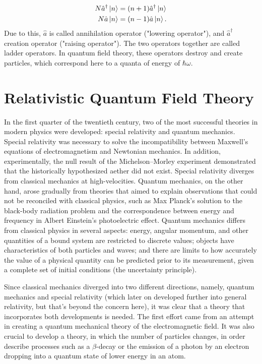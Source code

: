 \begin{equation}
\begin{split}
N\hat{a}^\dagger \ket{n} &= (n+1)\hat{a}^\dagger\ket{n} \\
N\hat{a}\ket{n} &= (n-1)\hat{a}\ket{n}.
\end{split}
\end{equation}
Due to this, $\hat{a}$ is called annihilation operator ("lowering operator"), and $\hat{a}^\dagger$ creation operator ("raising operator"). The two operators together are called ladder operators. In quantum field theory, these operators destroy and create particles, which correspond here to a quanta of energy of $\hbar\omega$.

\section{Relativistic Quantum Field Theory}
\label{sec:rqft}

In the first quarter of the twentieth century, two of the most successful theories in modern physics were developed: special relativity and quantum mechanics. Special relativity was necessary to solve the incompatibility between Maxwell's equations of electromagnetism and Newtonian mechanics. In addition, experimentally, the null result of the Michelson–Morley experiment demonstrated that the historically hypothesized aether did not exist. Special relativity diverges from classical mechanics at high-velocities. Quantum mechanics, on the other hand, arose gradually from theories that aimed to explain observations that could not be reconciled with classical physics, such as Max Planck's solution to the black-body radiation problem and the correspondence between energy and frequency in Albert Einstein's photoelectric effect. Quantum mechanics differs from classical physics in several aspects: energy, angular momentum, and other quantities of a bound system are restricted to discrete values; objects have characteristics of both particles and waves; and there are limits to how accurately the value of a physical quantity can be predicted prior to its measurement, given a complete set of initial conditions (the uncertainty principle).

Since classical mechanics diverged into two different directions, namely, quantum mechanics and special relativity (which later on developed further into general relativity, but that's beyond the concern here), it was clear that a theory that incorporates both developments is needed. The first effort came from an attempt in creating a quantum mechanical theory of the electromagnetic field. It was also crucial to develop a theory, in which the number of particles changes, in order describe processes such as a $\beta$-decay or the emission of a photon by an electron dropping into a quantum state of lower energy in an atom.

